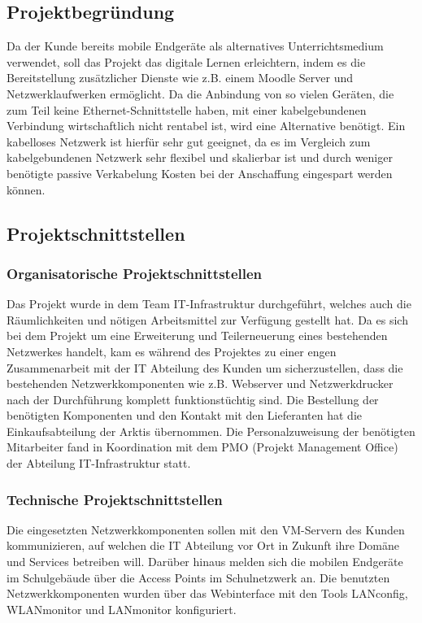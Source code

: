 \subsection{Projektbegründung} 
\label{sec:Projektbegruendung}
Da der Kunde bereits mobile Endgeräte als alternatives Unterrichtsmedium verwendet, soll das Projekt das digitale Lernen erleichtern, indem es die Bereitstellung zusätzlicher Dienste wie z.B. einem Moodle Server und Netzwerklaufwerken ermöglicht. 
Da die Anbindung von so vielen Geräten, die zum Teil keine Ethernet-Schnittstelle haben, mit einer kabelgebundenen Verbindung wirtschaftlich nicht rentabel ist, wird eine Alternative benötigt. 
Ein kabelloses Netzwerk ist hierfür sehr gut geeignet, da es im Vergleich zum kabelgebundenen Netzwerk sehr flexibel und skalierbar ist und durch weniger benötigte passive Verkabelung Kosten bei der Anschaffung eingespart werden können. 


\subsection{Projektschnittstellen} 
\label{sec:Projektschnittstellen}
\subsubsection{Organisatorische Projektschnittstellen}
Das Projekt wurde in dem Team IT-Infrastruktur durchgeführt, welches auch die Räumlichkeiten und nötigen Arbeitsmittel zur Verfügung gestellt hat. 
Da es sich bei dem Projekt um eine Erweiterung und Teilerneuerung eines bestehenden Netzwerkes handelt, kam es während des Projektes zu einer engen Zusammenarbeit mit der IT Abteilung des Kunden um sicherzustellen, dass die bestehenden Netzwerkkomponenten wie z.B. Webserver und Netzwerkdrucker nach der Durchführung komplett funktionstüchtig sind. 
Die Bestellung der benötigten Komponenten und den Kontakt mit den Lieferanten hat die Einkaufsabteilung der \ac{Arktis} übernommen. 
Die Personalzuweisung der benötigten Mitarbeiter fand in Koordination mit dem PMO (Projekt Management Office) der Abteilung IT-Infrastruktur statt.    
\subsubsection{Technische Projektschnittstellen}
Die eingesetzten Netzwerkkomponenten sollen mit den VM-Servern des Kunden kommunizieren, auf welchen die IT Abteilung vor Ort in Zukunft ihre Domäne und Services betreiben will. 
Darüber hinaus melden sich die mobilen Endgeräte im Schulgebäude über die Access Points im Schulnetzwerk an. 
Die benutzten Netzwerkkomponenten wurden über das Webinterface mit den Tools LANconfig, WLANmonitor und LANmonitor konfiguriert.
